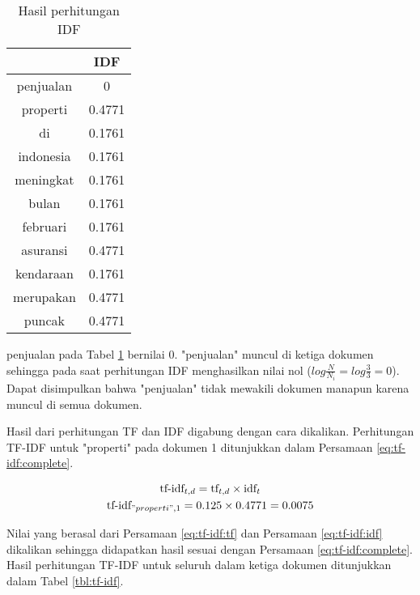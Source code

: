 \begin{table}[H]
	\centering
	\begin{tabular}{|c|c|} \hline
		\Term & IDF \\ \hline 
        penjualan & 0 \\ \hline
        properti & 0.4771 \\ \hline
        di & 0.1761 \\ \hline
        indonesia & 0.1761 \\ \hline
        meningkat & 0.1761 \\ \hline
        bulan & 0.1761 \\ \hline
        februari & 0.1761 \\ \hline
        asuransi & 0.4771 \\ \hline
        kendaraan & 0.1761 \\ \hline
        merupakan & 0.4771 \\ \hline
        puncak & 0.4771 \\ \hline
	\end{tabular}
	\caption{Hasil perhitungan IDF}
	\label{tbl:tf-idf:idf}
\end{table}

\Term penjualan pada Tabel \ref{tbl:tf-idf:idf} bernilai 0. \Term "penjualan" muncul di ketiga dokumen sehingga pada saat perhitungan IDF menghasilkan nilai nol ($log \frac{N}{N_i}=log \frac{3}{3} = 0$). Dapat disimpulkan bahwa \term "penjualan" tidak mewakili dokumen manapun karena muncul di semua dokumen.

Hasil dari perhitungan TF dan IDF digabung dengan cara dikalikan. Perhitungan TF-IDF untuk \term "properti" pada dokumen 1 ditunjukkan dalam Persamaan \ref{eq:tf-idf:complete}.

\begin{equation}
	\label{eq:tf-idf:complete}
	\begin{gathered}
	\textrm{tf-idf}_{t,d} = \textrm{tf}_{t,d} \times \textrm{idf}_t \\
	\textrm{tf-idf}_{"properti",1} = 0.125 \times 0.4771 = 0.0075
	\end{gathered}
\end{equation}

Nilai yang berasal dari Persamaan \ref{eq:tf-idf:tf} dan Persamaan \ref{eq:tf-idf:idf} dikalikan sehingga didapatkan hasil sesuai dengan Persamaan \ref{eq:tf-idf:complete}. Hasil perhitungan TF-IDF untuk seluruh \term dalam ketiga dokumen ditunjukkan dalam Tabel \ref{tbl:tf-idf}.

